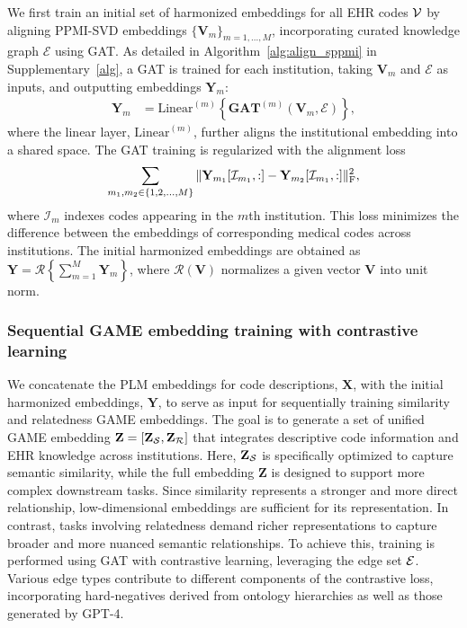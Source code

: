 \documentclass{article}
\def\Isc{\mathcal{I}}
\def\Rscr{\mathscr{R}}
\def\V{\mathbf{V}}
\def\X{\mathbf{X}}
\def\Y{\mathbf{Y}}
\def\Z{\mathbf{Z}}
\begin{document}
We first train an initial set of harmonized embeddings for all EHR codes $\mathcal{V}$ by aligning PPMI-SVD embeddings $\{\mathbf{V}_{m}\}_{m=1,...,M}$, incorporating curated knowledge graph $\mathcal{E}$ using GAT. As detailed in Algorithm~\ref{alg:align_sppmi} in Supplementary~\ref{alg}, a GAT is trained for each institution, taking 
$\mathbf{V}_{m}$ and $\mathcal{E}$ as inputs, and outputting embeddings  $\mathbf{Y}_m$:
\begin{align}
    \mathbf{Y}_m &=  \text{Linear}^{(m)}\left\{\textbf{GAT}^{(m)}\left(\V_m,\mathcal{E}\right)\right\},  \label{Align}
\end{align}
where the linear layer, $\text{Linear}^{(m)}$, further aligns the institutional embedding into a shared space. The GAT training is regularized with the alignment loss   
\begin{equation}
    \sum_{m_1, m_2 \in \{1,2,\ldots,M\}}\|\mathbf{Y}_{m_1}[\Isc_{m_1}, : ] -  \mathbf{Y}_{m_2}[\Isc_{m_1}, : ] \|_{\rm F}^2 ,
\label{align_loss}
\end{equation}
where $\Isc_m$ indexes codes appearing in the $m$th institution. This loss minimizes the difference between the embeddings of corresponding medical codes across institutions. The initial harmonized embeddings are obtained as
$\mathbf{Y} = \Rscr\left\{\sum_{m=1}^M\mathbf{Y}_m\right\}$, where $\Rscr(\mathbf{V})$ normalizes a given vector $\mathbf{V}$ into unit norm. 


\subsubsection{Sequential GAME embedding training with contrastive learning}
\label{train2}

We concatenate the PLM embeddings for code descriptions, 
$\X$, with the initial harmonized embeddings, 
$\Y$, to serve as input for sequentially training similarity and relatedness GAME embeddings. The goal is to generate a set of unified GAME embedding $\Z = [\Z_{\Ssc}, \Z_{\Rsc}]$ that integrates descriptive code information and EHR knowledge across institutions. Here, $\Z_{\Ssc}$ is specifically optimized to capture semantic similarity, while the full embedding $\Z$ is designed to support more complex downstream tasks. Since similarity represents a stronger and more direct relationship, low-dimensional embeddings are sufficient for its representation. In contrast, tasks involving relatedness demand richer representations to capture broader and more nuanced semantic relationships. To achieve this, training is performed using GAT with contrastive learning, leveraging the edge set $\mathcal{E}$. Various edge types contribute to different components of the contrastive loss, incorporating hard-negatives derived from ontology hierarchies as well as those generated by GPT-4.
\end{document}
